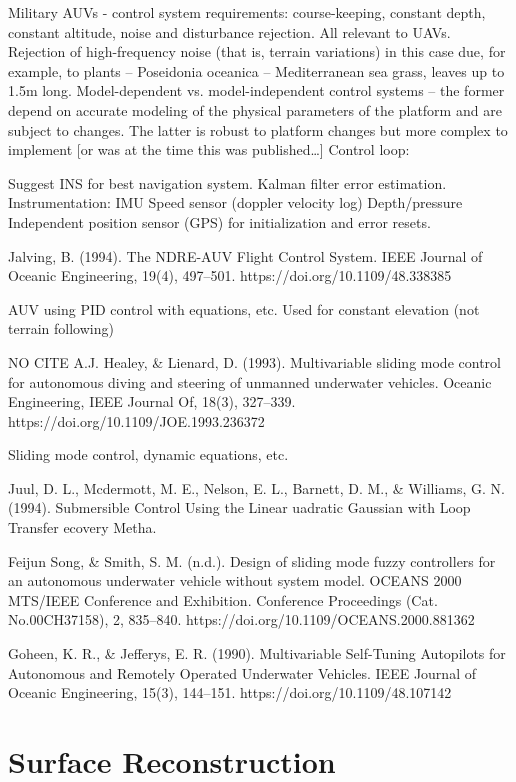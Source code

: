 Military AUVs - control system requirements: course-keeping, constant depth, constant altitude, noise and disturbance rejection. All relevant to UAVs.
Rejection of high-frequency noise (that is, terrain variations) in this case due, for example, to plants -- Poseidonia oceanica -- Mediterranean sea grass, leaves up to 1.5m long.
Model-dependent vs. model-independent control systems -- the former depend on accurate modeling of the physical parameters of the platform and are subject to changes. The latter is robust to platform changes but more complex to implement [or was at the time this was published…]
Control loop:

Suggest INS for best navigation system.
Kalman filter error estimation.
Instrumentation:
IMU
Speed sensor (doppler velocity log)
Depth/pressure
Independent position sensor (GPS) for initialization and error resets.

\cite{Jalving1994}
Jalving, B. (1994). The NDRE-AUV Flight Control System. IEEE Journal of Oceanic Engineering, 19(4), 497–501. https://doi.org/10.1109/48.338385

AUV using PID control with equations, etc.
Used for constant elevation (not terrain following)

NO CITE
A.J. Healey, \& Lienard, D. (1993). Multivariable sliding mode control for autonomous diving and steering of unmanned underwater vehicles. Oceanic Engineering, IEEE Journal Of, 18(3), 327–339. https://doi.org/10.1109/JOE.1993.236372

Sliding mode control, dynamic equations, etc.

\cite{Juul1994}
Juul, D. L., Mcdermott, M. E., Nelson, E. L., Barnett, D. M., \& Williams, G. N. (1994). Submersible Control Using the Linear uadratic Gaussian with Loop Transfer ecovery Metha.

\cite{FeijunSong}
Feijun Song, \& Smith, S. M. (n.d.). Design of sliding mode fuzzy controllers for an autonomous underwater vehicle without system model. OCEANS 2000 MTS/IEEE Conference and Exhibition. Conference Proceedings (Cat. No.00CH37158), 2, 835–840. https://doi.org/10.1109/OCEANS.2000.881362

\cite{Goheen1990}
Goheen, K. R., \& Jefferys, E. R. (1990). Multivariable Self-Tuning Autopilots for Autonomous and Remotely Operated Underwater Vehicles. IEEE Journal of Oceanic Engineering, 15(3), 144–151. https://doi.org/10.1109/48.107142

\section{Surface Reconstruction}


